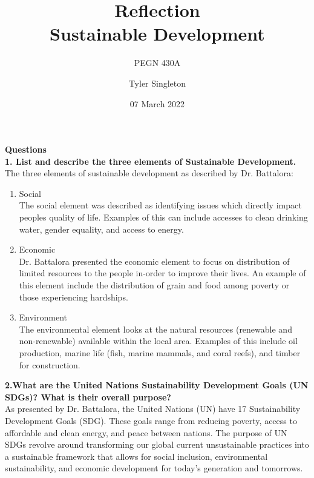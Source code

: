 \documentclass[12pt]{article}
\title{Reflection\\
Sustainable Development}
\subtitle{PEGN 430A}
\author{Tyler Singleton}
\date{07 March 2022}
\begin{document}
\maketitle

\newpage
\setlength{\parindent}{0pt}

\textbf{Questions} \\

\textbf{1. List and describe the three elements of Sustainable Development.} \\

The three elements of sustainable development as described by Dr. Battalora:

\begin{enumerate}
    \item Social \\
    The social element was described as identifying issues which directly impact peoples quality of life. Examples of this can include accesses to clean drinking water, gender equality, and access to energy. 
    
    \item Economic \\
    Dr. Battalora presented the economic element to focus on distribution of limited resources to the people in-order to improve their lives. An example of this element include the distribution of grain and food among poverty or those experiencing hardships.
    
    \item Environment \\
    The environmental element looks at the natural resources (renewable and non-renewable) available within the local area. Examples of this include oil production, marine life (fish, marine mammals, and coral reefs), and timber for construction.
\end{enumerate}

\textbf{2.What are the United Nations Sustainability Development Goals (UN SDGs)?  What is their overall purpose?} \\

As presented by Dr. Battalora, the United Nations (UN) have 17 Sustainability Development Goals (SDG). These goals range from reducing poverty, access to affordable and clean energy, and peace between nations. The purpose of UN SDGs revolve around transforming our global current unsustainable practices into a sustainable framework that allows for social inclusion, environmental sustainability, and economic development for today's generation and tomorrows. \\
\end{document}
